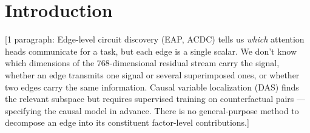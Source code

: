 \documentclass[11pt]{article}
\begin{document}
\begin{abstract}
[1 sentence (NEW v6): Analyzing the relationship between attribution
and causal structure reveals a striking finding: the factor subspace
explaining most attribution variance is nearly orthogonal
($\sim$88\textdegree) to the causally-active subspace (DAS), with a
14--40$\times$ gap between activation universality and causal specificity.
Tucker modes capture the modulation component --- necessary for task
performance (removing 8 modes drops logit diff by 21\%) but not
sufficient in isolation (keeping only Tucker modes reverses the logit
diff). The factor manifold acts as a gradient attractor ($\rho$:
26\%$\to$83\%), determining whether DAS training finds the global optimum
--- a launch pad for causal discovery, not a container.]
\end{abstract}



\section{Introduction}



[1 paragraph: Edge-level circuit discovery (EAP, ACDC) tells us \emph{which}
attention heads communicate for a task, but each edge is a single scalar.
We don't know which dimensions of the 768-dimensional residual stream
carry the signal, whether an edge transmits one signal or several
superimposed ones, or whether two edges carry the same information.
Causal variable localization (DAS) finds the relevant subspace but
requires supervised training on counterfactual pairs --- specifying the
causal model in advance. There is no general-purpose method to decompose
an edge into its constituent factor-level contributions.]
\end{document}
